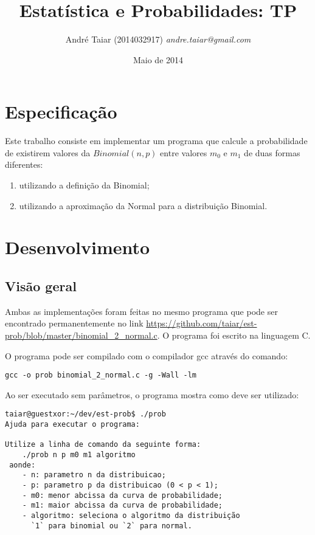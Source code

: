 \documentclass[12pt, a4paper]{article}
\title{Estatística e Probabilidades: TP}
\date{Maio de 2014}
\author{
    André Taiar (2014032917) \emph{andre.taiar@gmail.com}\\
}
\begin{document}
\maketitle

\section{Especificação}

Este trabalho consiste em implementar um programa que calcule a probabilidade de existirem valores
da $Binomial(n,p)$ entre valores $m_0$ e $m_1$ de duas formas diferentes:

\begin{enumerate}
    \item utilizando a definição da Binomial;
    \item utilizando a aproximação da Normal para a distribuição Binomial.
\end{enumerate}

\section{Desenvolvimento}

\subsection{Visão geral}

Ambas as implementações foram feitas no mesmo programa que pode ser encontrado permanentemente no
link \url{https://github.com/taiar/est-prob/blob/master/binomial_2_normal.c}. O programa foi escrito
na linguagem C.

O programa pode ser compilado com o compilador gcc através do comando:

\begin{verbatim}
gcc -o prob binomial_2_normal.c -g -Wall -lm
\end{verbatim}

Ao ser executado sem parâmetros, o programa mostra como deve ser utilizado:

\begin{verbatim}
taiar@guestxor:~/dev/est-prob$ ./prob
Ajuda para executar o programa:

Utilize a linha de comando da seguinte forma:
    ./prob n p m0 m1 algoritmo
 aonde:
    - n: parametro n da distribuicao;
    - p: parametro p da distribuicao (0 < p < 1);
    - m0: menor abcissa da curva de probabilidade;
    - m1: maior abcissa da curva de probabilidade;
    - algoritmo: seleciona o algoritmo da distribuição
      `1` para binomial ou `2` para normal.
\end{verbatim}
\end{document}
